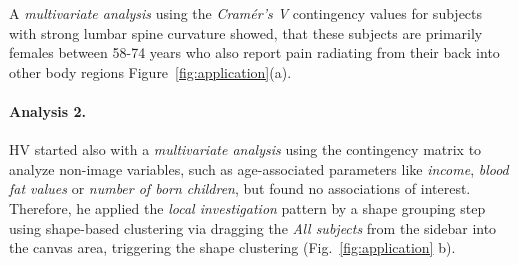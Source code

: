 \documentclass[journal]{style/vgtc} 			          %
\newcommand{\com}[1]{\textcolor{orange}{\uline{#1}}}
\begin{document}
A \emph{multivariate analysis} using the \emph{Cram\'{e}r's V} contingency values for subjects with strong lumbar spine curvature showed, that these subjects are primarily females between 58-74 years who also report pain radiating from their back into other body regions Figure~\ref{fig:application}(a).
%
%
\paragraph{Analysis 2.}
%
HV started also with a \emph{multivariate analysis} using the contingency matrix to analyze non-image variables, such as age-associated parameters like \emph{income}, \emph{blood fat values} or \emph{number of born children}, but found no associations of interest.
%
Therefore, he applied the \emph{local investigation} pattern by a shape grouping step using shape-based clustering via dragging the \emph{All subjects} from the sidebar into the canvas area, triggering the shape clustering (Fig.~\ref{fig:application} b).
%
\end{document}
